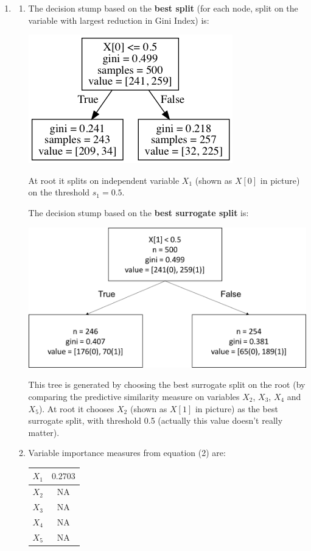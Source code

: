 \documentclass[paper=letter, fontsize=12pt]{article}
\begin{document}
\begin{enumerate}[label=(\alph*)]
	\item 
	\begin{enumerate}[label=(\roman*)]
		\item 
		The decision stump based on the \textbf{best split} (for each node, split on the variable with largest reduction in Gini Index) is:
		
		\includegraphics[scale=0.6]{tree_best_split.png}
		
		At root it splits on independent variable $X_1$ (shown as $X[0]$ in picture) on the threshold $s_1 = 0.5$.
		
		The decision stump based on the \textbf{best surrogate split} is:
		
		\includegraphics[scale=0.4]{tree_best_surrogate_split.png}
		
		This tree is generated by choosing the best surrogate split on the root (by comparing the predictive similarity measure on variables $X_2$, $X_3$, $X_4$ and $X_5$). At root it chooses $X_2$ (shown as $X[1]$ in picture) as the best surrogate split, with threshold 0.5 (actually this value doesn't really matter).
		
		\item Variable importance measures from equation (2) are:
		
		\begin{center}
			\begin{tabular}{|c|c|}
				\hline
				$X_1$ & $0.2703$ \\ \hline
				$X_2$ & NA \\ \hline
				$X_3$ & NA \\ \hline
				$X_4$ & NA \\ \hline
				$X_5$ & NA \\ \hline
			\end{tabular}
		\end{center}
			

\end{enumerate}
\end{enumerate}
\end{document}
